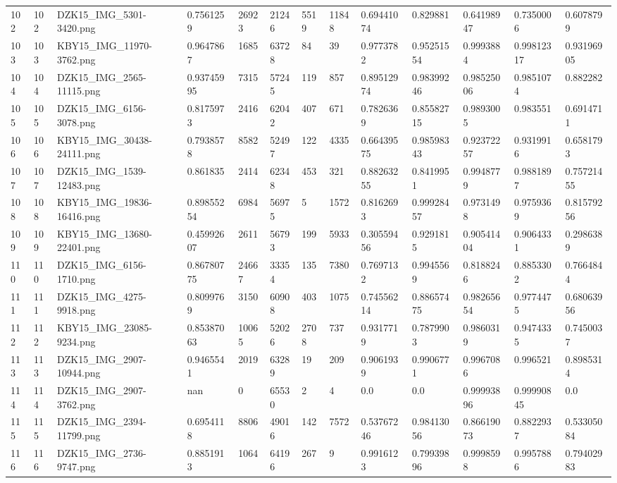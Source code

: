 \documentclass[11pt, a4paper, twoside]{report}
\begin{document}
\begin{longtable}[c]{@{}lllllllllllll@{}}
102 & 102 & DZK15\_IMG\_5301-3420.png & 0.7561259 & 26923 & 21246 & 5519 & 11848 & 0.69441074 & 0.829881 & 0.64198947 & 0.7350006 & 0.6078799 \\
103 & 103 & KBY15\_IMG\_11970-3762.png & 0.9647867 & 1685 & 63728 & 84 & 39 & 0.9773782 & 0.95251554 & 0.9993884 & 0.99812317 & 0.93196905 \\
104 & 104 & DZK15\_IMG\_2565-11115.png & 0.93745995 & 7315 & 57245 & 119 & 857 & 0.89512974 & 0.98399246 & 0.98525006 & 0.9851074 & 0.882282 \\
105 & 105 & DZK15\_IMG\_6156-3078.png & 0.8175973 & 2416 & 62042 & 407 & 671 & 0.7826369 & 0.85582715 & 0.9893005 & 0.983551 & 0.6914711 \\
106 & 106 & KBY15\_IMG\_30438-24111.png & 0.7938578 & 8582 & 52497 & 122 & 4335 & 0.66439575 & 0.98598343 & 0.92372257 & 0.9319916 & 0.6581793 \\
107 & 107 & DZK15\_IMG\_1539-12483.png & 0.861835 & 2414 & 62348 & 453 & 321 & 0.88263255 & 0.8419951 & 0.9948779 & 0.9881897 & 0.75721455 \\
108 & 108 & KBY15\_IMG\_19836-16416.png & 0.89855254 & 6984 & 56975 & 5 & 1572 & 0.8162693 & 0.99928457 & 0.9731498 & 0.9759369 & 0.81579256 \\
109 & 109 & KBY15\_IMG\_13680-22401.png & 0.45992607 & 2611 & 56793 & 199 & 5933 & 0.30559456 & 0.9291815 & 0.90541404 & 0.9064331 & 0.2986389 \\
110 & 110 & DZK15\_IMG\_6156-1710.png & 0.86780775 & 24667 & 33354 & 135 & 7380 & 0.7697132 & 0.9945569 & 0.8188246 & 0.8853302 & 0.7664844 \\
111 & 111 & DZK15\_IMG\_4275-9918.png & 0.8099769 & 3150 & 60908 & 403 & 1075 & 0.74556214 & 0.88657475 & 0.98265654 & 0.9774475 & 0.68063956 \\
112 & 112 & KBY15\_IMG\_23085-9234.png & 0.85387063 & 10065 & 52026 & 2708 & 737 & 0.9317719 & 0.7879903 & 0.9860319 & 0.9474335 & 0.7450037 \\
113 & 113 & DZK15\_IMG\_2907-10944.png & 0.9465541 & 2019 & 63289 & 19 & 209 & 0.9061939 & 0.9906771 & 0.9967086 & 0.996521 & 0.8985314 \\
114 & 114 & DZK15\_IMG\_2907-3762.png & nan & 0 & 65530 & 2 & 4 & 0.0 & 0.0 & 0.99993896 & 0.99990845 & 0.0 \\
115 & 115 & DZK15\_IMG\_2394-11799.png & 0.6954118 & 8806 & 49016 & 142 & 7572 & 0.53767246 & 0.98413056 & 0.86619073 & 0.8822937 & 0.53305084 \\
116 & 116 & DZK15\_IMG\_2736-9747.png & 0.8851913 & 1064 & 64196 & 267 & 9 & 0.9916123 & 0.79939896 & 0.9998598 & 0.9957886 & 0.79402983 \\

\end{longtable}
\end{document}
